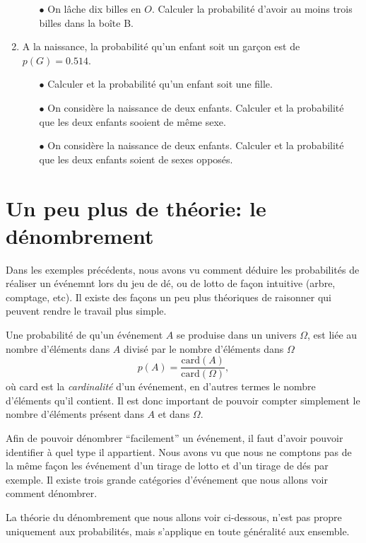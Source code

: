 \documentclass[a4paper,12pt]{book}
\newcommand{\card}{\mathrm{card}}
\begin{document}
\begin{enumerate}
\begin{itemize}
\item[$\bullet$] On lâche dix billes en $O$. Calculer la probabilité d'avoir au moins trois billes dans la boîte B.
\end{itemize}
\item A la naissance, la probabilité qu'un enfant soit un garçon
est de $p(G)=0.514$.
\begin{itemize}
 \item[$\bullet$] Calculer et la probabilité qu'un enfant soit une fille.
 \item[$\bullet$] On considère la naissance de deux enfants. Calculer et la probabilité que les deux enfants sooient de même sexe.
 \item[$\bullet$] On considère la naissance de deux enfants. Calculer et la probabilité que les deux enfants soient de sexes opposés.
\end{itemize}
\end{enumerate}



\section{Un peu plus de théorie: le dénombrement}

Dans les exemples précédents, nous avons vu comment déduire les probabilités de réaliser un événemnt lors du jeu de dé, 
ou de lotto de façon intuitive (arbre, comptage, etc). Il existe des façons un peu plus théoriques de raisonner 
qui peuvent rendre le travail plus simple. 

Une probabilité de qu'un événement $A$ se produise dans un univers $\Omega$, est liée 
au nombre d'éléments dans $A$ divisé par le nombre d'éléments dans $\Omega$
\begin{equation*}
 p(A)=\frac{\card(A)}{\card(\Omega)},
\end{equation*}
où card est la \textit{cardinalité} d'un événement, en d'autres termes le nombre d'éléments qu'il contient.
Il est donc important de pouvoir compter simplement le nombre d'éléments présent dans $A$ et dans $\Omega$.

Afin de pouvoir dénombrer ``facilement'' un événement, il faut d'avoir pouvoir identifier 
à quel type il appartient. Nous avons vu que nous ne comptons pas de la même façon les événement 
d'un tirage de lotto et d'un tirage de dés par exemple. 
Il existe trois grande catégories d'événement que nous allons voir comment dénombrer.

La théorie du dénombrement que nous allons voir ci-dessous, n'est pas propre uniquement aux probabilités, 
mais s'applique en toute généralité aux ensemble.
\end{document}
